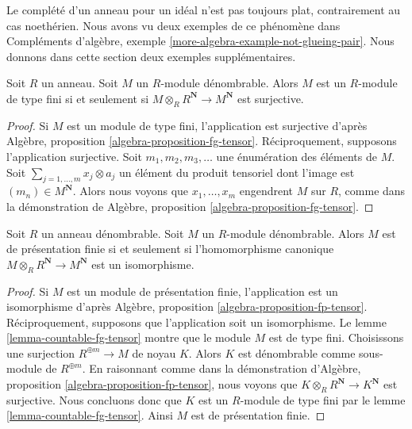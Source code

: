 \noindent
Le complété d'un anneau pour un idéal n'est pas toujours plat,
contrairement au cas noethérien. Nous avons vu deux exemples de ce
phénomène dans
Compléments d'algèbre, exemple \ref{more-algebra-example-not-glueing-pair}.
Nous donnons dans cette section deux exemples supplémentaires.

\begin{lemma}
\label{lemma-countable-fg-tensor}
Soit $R$ un anneau. Soit $M$ un $R$-module dénombrable.
Alors $M$ est un $R$-module de type fini si et seulement si
$M \otimes_R R^\mathbf{N} \to M^\mathbf{N}$ est surjective.
\end{lemma}

\begin{proof}
Si $M$ est un module de type fini, l'application est surjective d'après Algèbre, proposition
\ref{algebra-proposition-fg-tensor}. Réciproquement, supposons l'application surjective.
Soit $m_1, m_2, m_3, \ldots$ une énumération des éléments de $M$.
Soit $\sum_{j = 1, \ldots, m} x_j \otimes a_j$ un élément du
produit tensoriel dont l'image est $(m_n) \in M^\mathbf{N}$. Alors
nous voyons que $x_1, \ldots, x_m$ engendrent $M$ sur $R$, comme dans la démonstration de
Algèbre, proposition \ref{algebra-proposition-fg-tensor}.
\end{proof}

\begin{lemma}
\label{lemma-countable-fp-tensor}
Soit $R$ un anneau dénombrable. Soit $M$ un $R$-module dénombrable. Alors $M$
est de présentation finie si et seulement si l'homomorphisme canonique
$M \otimes_R R^\mathbf{N} \to M^\mathbf{N}$ est un isomorphisme.
\end{lemma}

\begin{proof}
Si $M$ est un module de présentation finie, l'application est un isomorphisme
d'après Algèbre, proposition \ref{algebra-proposition-fp-tensor}. Réciproquement,
supposons que l'application soit un isomorphisme. Le lemme \ref{lemma-countable-fg-tensor}
montre que le module $M$ est de type fini. Choisissons une surjection $R^{\oplus m} \to M$ de
noyau $K$. Alors $K$ est dénombrable comme sous-module de $R^{\oplus m}$.
En raisonnant comme dans la démonstration d'Algèbre, proposition
\ref{algebra-proposition-fp-tensor}, nous voyons que
$K \otimes_R R^\mathbf{N} \to K^\mathbf{N}$ est surjective.
Nous concluons donc que $K$ est un $R$-module de type fini par le
lemme \ref{lemma-countable-fg-tensor}.
Ainsi $M$ est de présentation finie.
\end{proof}

